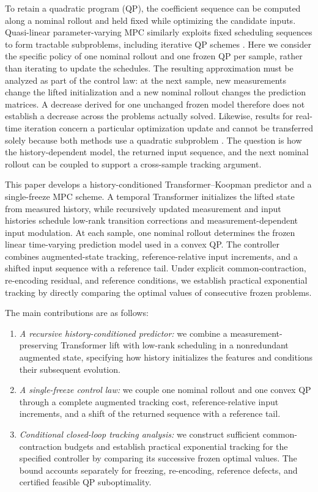 \documentclass[journal]{IEEEtran}
\begin{document}
To retain a quadratic program (QP), the coefficient sequence can be computed along a nominal rollout and held fixed while optimizing the candidate inputs. Quasi-linear parameter-varying MPC similarly exploits fixed scheduling sequences to form tractable subproblems, including iterative QP schemes \cite{cisneros2016qlmpc,cisneros2020qlpv}. Here we consider the specific policy of one nominal rollout and one frozen QP per sample, rather than iterating to update the schedules. The resulting approximation must be analyzed as part of the control law: at the next sample, new measurements change the lifted initialization and a new nominal rollout changes the prediction matrices. A decrease derived for one unchanged frozen model therefore does not establish a decrease across the problems actually solved. Likewise, results for real-time iteration concern a particular optimization update and cannot be transferred solely because both methods use a quadratic subproblem \cite{diehl2005realtime,gros2020rti}. The question is how the history-dependent model, the returned input sequence, and the next nominal rollout can be coupled to support a cross-sample tracking argument.

This paper develops a history-conditioned Transformer--Koopman predictor and a single-freeze MPC scheme. A temporal Transformer initializes the lifted state from measured history, while recursively updated measurement and input histories schedule low-rank transition corrections and measurement-dependent input modulation. At each sample, one nominal rollout determines the frozen linear time-varying prediction model used in a convex QP. The controller combines augmented-state tracking, reference-relative input increments, and a shifted input sequence with a reference tail. Under explicit common-contraction, re-encoding residual, and reference conditions, we establish practical exponential tracking by directly comparing the optimal values of consecutive frozen problems.

The main contributions are as follows:
\begin{enumerate}
\item \emph{A recursive history-conditioned predictor:} we combine a measurement-preserving Transformer lift with low-rank scheduling in a nonredundant augmented state, specifying how history initializes the features and conditions their subsequent evolution.
\item \emph{A single-freeze control law:} we couple one nominal rollout and one convex QP through a complete augmented tracking cost, reference-relative input increments, and a shift of the returned sequence with a reference tail.
\item \emph{Conditional closed-loop tracking analysis:} we construct sufficient common-contraction budgets and establish practical exponential tracking for the specified controller by comparing its successive frozen optimal values. The bound accounts separately for freezing, re-encoding, reference defects, and certified feasible QP suboptimality.
\end{enumerate}
\end{document}
